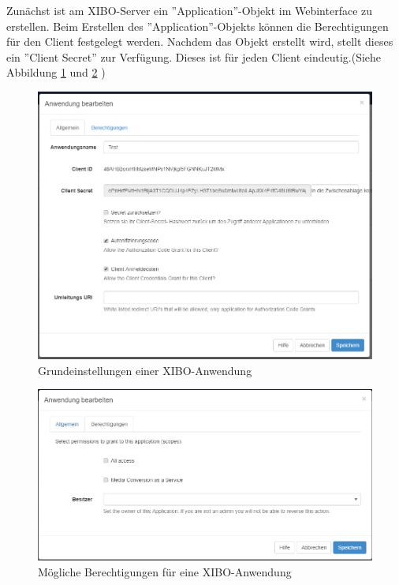 Zunächst ist am XIBO-Server ein ''Application''-Objekt im Webinterface zu erstellen. Beim Erstellen des ''Application''-Objekts können die Berechtigungen für den Client festgelegt werden. Nachdem das Objekt erstellt wird, stellt dieses ein ''Client Secret'' zur Verfügung. Dieses ist für jeden Client eindeutig.(Siehe Abbildung \ref{fig:base} und \ref{fig:permis} )
\begin{figure}[H]
\centering
\includegraphics[width=1.0\textwidth]{images/03_XIBO-Server/03_EditApplikation}
\caption{Grundeinstellungen einer XIBO-Anwendung}
\label{fig:base}
\end{figure}
\begin{figure}[H]
\centering
\includegraphics[width=1.0\textwidth]{images/03_XIBO-Server/03_ApplikationPermission}
\caption{Mögliche Berechtigungen für eine XIBO-Anwendung}
\label{fig:permis}
\end{figure}

